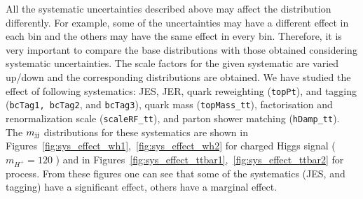 
All the systematic uncertainties described above may affect the \mjj distribution differently.
For example, some of the uncertainties may have a different effect in each bin and the others
may have the same effect in every bin. Therefore, it is very important to compare the base \mjj
distributions with those obtained considering systematic uncertainties. The scale factors for the 
given systematic are varied up/down and the corresponding \mjj distributions are obtained. We have 
studied the effect 
of following systematics: JES, JER, \PQt quark \pt reweighting (\verb|topPt|), \PQb and \PQc tagging 
(\verb|bcTag1, bcTag2|, and \verb|bcTag3|), \PQt quark mass
(\verb|topMass_tt|), factorisation and renormalization scale (\verb|scaleRF_tt|), and parton shower matching (\verb|hDamp_tt|). The $m_\text{jj}$ distributions for 
these systematics are shown in Figures~\ref{fig:sys_effect_wh1},~\ref{fig:sys_effect_wh2} for charged 
Higgs signal ($m_{H^+} = 120$ \GeV) and in 
Figures~\ref{fig:sys_effect_ttbar1},~\ref{fig:sys_effect_ttbar2} for \ttjets process. From these 
figures one can see that some of the systematics (JES, \PQb and \PQc tagging) have  a significant 
effect, others have a marginal effect.

